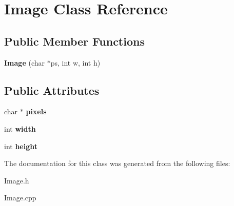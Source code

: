\hypertarget{classImage}{\section{Image Class Reference}
\label{classImage}
}
\subsection*{Public Member Functions}
\begin{DoxyCompactItemize}
\item 
\hypertarget{classImage_a68e85406b33c38cc93a22b0121da47d9}{{\bfseries Image} (char $\ast$ps, int w, int h)}\label{classImage_a68e85406b33c38cc93a22b0121da47d9}

\end{DoxyCompactItemize}
\subsection*{Public Attributes}
\begin{DoxyCompactItemize}
\item 
\hypertarget{classImage_a6afbcf4b0a2774f020ce350bff9d0d6c}{char $\ast$ {\bfseries pixels}}\label{classImage_a6afbcf4b0a2774f020ce350bff9d0d6c}

\item 
\hypertarget{classImage_ab8d12f635013c04159cd4d3d972bac88}{int {\bfseries width}}\label{classImage_ab8d12f635013c04159cd4d3d972bac88}

\item 
\hypertarget{classImage_a51df43db420c9c0b57536cb2dd36de5c}{int {\bfseries height}}\label{classImage_a51df43db420c9c0b57536cb2dd36de5c}

\end{DoxyCompactItemize}


The documentation for this class was generated from the following files\+:\begin{DoxyCompactItemize}
\item 
Image.\+h\item 
Image.\+cpp\end{DoxyCompactItemize}
